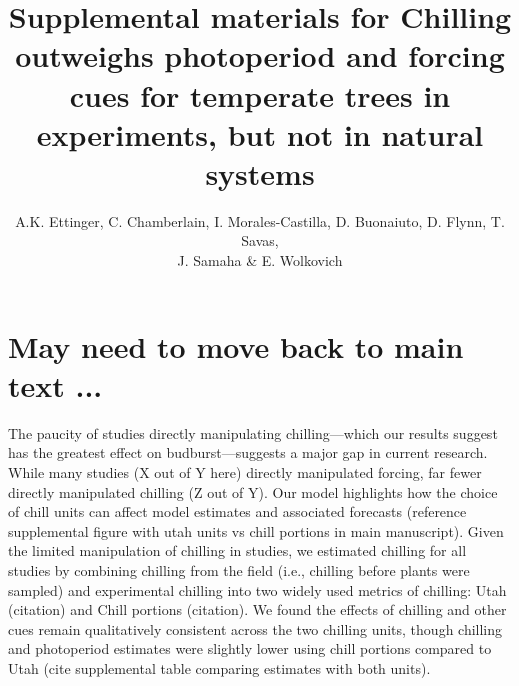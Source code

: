 \documentclass{article}
\begin{document}

\title{Supplemental materials  for Chilling outweighs photoperiod and forcing cues for temperate trees in experiments, but not in natural systems} %

\author{A.K. Ettinger, C. Chamberlain, I. Morales-Castilla, D. Buonaiuto, D. Flynn, T. Savas, \\J. Samaha \& E. Wolkovich}
\maketitle  %


\section*{May need to move back to main text ...}

\par The paucity of studies directly manipulating chilling---which our results suggest has the greatest effect on budburst---suggests a major gap in current research. While many studies (X out of Y here) directly manipulated forcing, far fewer directly manipulated chilling (Z out of Y). 
Our model highlights how the choice of chill units can affect model estimates and associated forecasts (reference supplemental figure with utah units vs chill portions in main manuscript). 
Given the limited manipulation of chilling in studies, we estimated chilling for all studies by combining chilling from the field (i.e., chilling before plants were sampled) and experimental chilling into two widely used metrics of chilling: Utah (citation) and Chill portions (citation). We found the effects of chilling and other cues remain qualitatively consistent across the two chilling units, though chilling and photoperiod estimates were slightly lower using chill portions compared to Utah (cite supplemental table comparing estimates with both units).  %
\end{document}
